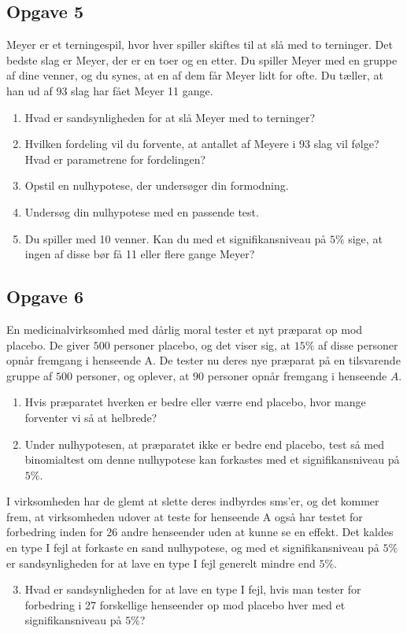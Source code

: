 \documentclass[12pt]{article}
\begin{document}
\subsection*{Opgave 5}
Meyer er et terningespil, hvor hver spiller skiftes til at slå med to terninger. Det bedste slag er Meyer, der er en toer og en etter. Du spiller Meyer med en gruppe af dine venner, og du synes, at en af dem får Meyer lidt for ofte. Du tæller, at han ud af 93 slag har fået Meyer 11 gange.
\begin{enumerate}[label=\roman*)]
\item Hvad er sandsynligheden for at slå Meyer med to terninger?
\item Hvilken fordeling vil du forvente, at antallet af Meyere i 93 slag vil følge? Hvad er parametrene for fordelingen?
\item Opstil en nulhypotese, der undersøger din formodning.
\item Undersøg din nulhypotese med en passende test. 
\item Du spiller med 10 venner. Kan du med et signifikansniveau på $5\%$ sige, at ingen af disse bør få 11 eller flere gange Meyer?
\end{enumerate}

\subsection*{Opgave 6}
En medicinalvirksomhed med dårlig moral tester et nyt præparat op mod placebo. De giver $500$ personer placebo, og det viser sig, at $15\%$ af disse personer opnår fremgang i henseende A. De tester nu deres nye præparat på en tilsvarende gruppe af $500$ personer, og oplever, at $90$ personer opnår fremgang i henseende $A$. 
\begin{enumerate}[label=\roman*)]
\item Hvis præparatet hverken er bedre eller værre end placebo, hvor mange forventer vi så at helbrede?
\item Under nulhypotesen, at præparatet ikke er bedre end placebo, test så med binomialtest om denne nulhypotese kan forkastes med et signifikansniveau på $5\%$.
\end{enumerate}
I virksomheden har de glemt at slette deres indbyrdes sms'er, og det kommer frem, at virksomheden udover at teste for henseende A også har testet for forbedring inden for 26 andre henseender uden at kunne se en effekt. Det kaldes en type I fejl at forkaste en sand nulhypotese, og med et signifikansniveau på $5\%$ er sandsynligheden for at lave en type I fejl generelt mindre end $5\%$. 
\begin{enumerate}[label=\roman*)]
\setcounter{enumi}{2}
\item Hvad er sandsynligheden for at lave en type I fejl, hvis man tester for forbedring i 27 forskellige henseender op mod placebo hver med et signifikansniveau på $5\%$?

\end{enumerate}
\end{document}
